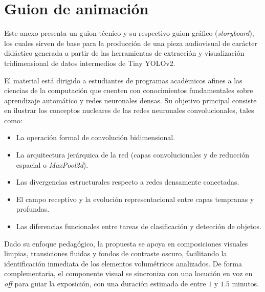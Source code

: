 \chapter{Guion de animación}
\label{anx:guion_anim}
Este anexo presenta un guion técnico y su respectivo guion gráfico (\textit{storyboard}), 
los cuales sirven de base para la producción de una pieza audiovisual de carácter didáctico 
generada a partir de las herramientas de extracción y visualización tridimensional de datos intermedios de Tiny YOLOv2.
\medskip

El material está dirigido a estudiantes de programas académicos afines a las ciencias de la 
computación que cuenten con conocimientos fundamentales sobre aprendizaje automático y 
redes neuronales densas. Su objetivo principal consiste en ilustrar los conceptos nucleares 
de las redes neuronales convolucionales, tales como:
\begin{itemize}
    \item La operación formal de convolución bidimensional.
    \item La arquitectura jerárquica de la red (capas convolucionales y de reducción espacial o \textit{MaxPool2d}).
    \item Las divergencias estructurales respecto a redes densamente conectadas.
    \item El campo receptivo y la evolución representacional entre capas tempranas y profundas.
    \item Las diferencias funcionales entre tareas de clasificación y detección de objetos.
\end{itemize}

Dado su enfoque pedagógico, la propuesta se apoya en composiciones visuales limpias, transiciones fluidas y 
fondos de contraste oscuro, facilitando la identificación inmediata de los elementos volumétricos analizados. 
De forma complementaria, el componente visual se sincroniza con una locución en voz en \textit{off} para guiar 
la exposición, con una duración estimada de entre $1$ y $1.5$ minutos.

